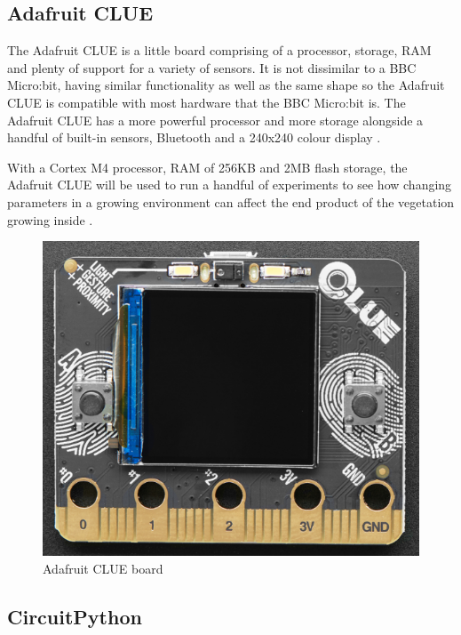 \subsection{Adafruit CLUE}

The Adafruit CLUE is a little board comprising of a processor, storage, RAM and plenty of support for a variety of sensors. It is not dissimilar to a BBC Micro:bit, having similar functionality as well as the same shape so the Adafruit CLUE is compatible with most hardware that the BBC Micro:bit is. The Adafruit CLUE has a more powerful processor and more storage alongside a handful of built-in sensors, Bluetooth and a 240x240 colour display \cite{learnAdafruit}.

With a Cortex M4 processor, RAM of 256KB and 2MB flash storage, the Adafruit CLUE will be used to run a handful of experiments to see how changing parameters in a growing environment can affect the end product of the vegetation growing inside \cite{learnAdafruit}.

\begin{figure}[ht]
    \centering
    \includegraphics[scale=0.4]{Report/Images/ClueBoard.png}
    \caption{Adafruit CLUE board \cite{learnAdafruit}}
    \label{fig:adafruitClue}
\end{figure}

\subsection{CircuitPython}

